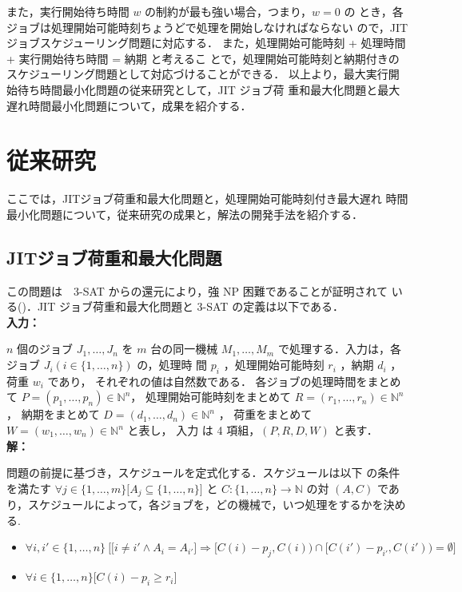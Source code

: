 \documentclass[12pt]{optlab-bachelor}
\begin{document}
また，実行開始待ち時間 $w$ の制約が最も強い場合，つまり，$w = 0$ の
とき，各ジョブは処理開始可能時刻ちょうどで処理を開始しなければならない
ので，JITジョブスケジューリング問題に対応する．
また，処理開始可能時刻 + 処理時間 + 実行開始待ち時間 = 納期 と考えるこ
とで，処理開始可能時刻と納期付きのスケジューリング問題として対応づけることができる．
以上より，最大実行開始待ち時間最小化問題の従来研究として，JIT ジョブ荷
重和最大化問題と最大遅れ時間最小化問題について，成果を紹介する．


\chapter{従来研究}
ここでは，JITジョブ荷重和最大化問題と，処理開始可能時刻付き最大遅れ
時間最小化問題について，従来研究の成果と，解法の開発手法を紹介する．

\section{JITジョブ荷重和最大化問題} %
この問題は　3-SAT からの還元により，強 NP 困難であることが証明されて
いる()．JIT ジョブ荷重和最大化問題と 3-SAT の定義は以下である．\\

\noindent \textbf{入力：}

$n$ 個のジョブ $J_1,\ldots,J_n$ を $m$ 台の同一機械 $M_1,\ldots,M_m$
で処理する．入力は，各ジョブ $J_i ( i \in \{1,\ldots,n\} )$ の，処理時
間 $p_i$ ，処理開始可能時刻 $r_i$ ，納期 $d_i$ ，荷重 $w_i$ であり，
それぞれの値は自然数である．
各ジョブの処理時間をまとめて $P = (p_1,\ldots,p_n) \in \mathbb{N}^n$，
処理開始可能時刻をまとめて $R = (r_1,\ldots,r_n) \in \mathbb{N}^n$ ，
納期をまとめて $D = (d_1,\ldots,d_n) \in \mathbb{N}^n$ ，
荷重をまとめて $W = (w_1,\ldots,w_n) \in \mathbb{N}^n$ と表し，
入力 は 4 項組，$(P,R,D,W)$ と表す．\\

\noindent \textbf{解：}

問題の前提に基づき，スケジュールを定式化する．スケジュールは以下
の条件を満たす $\forall j \in \{1,\ldots,m\}\big[A_j \subseteq
\{1,\ldots,n\}\big]$ と $C : \{1,\ldots,n\} \to \mathbb{N}$ の対 $(A,
C)$ であり，スケジュールによって，各ジョブを，どの機械で，いつ処理をするかを決める.
\begin{itemize}
\item $\forall i, i' \in \{1,\ldots,n\}\ \Big[ \big[i \neq i' \land A_i =
  A_{i'}\big] \Rightarrow [C(i) - p_j, C(i)) \cap [C(i') - p_{i'}, C(i')) = \emptyset \Big]$
\item  $\forall i \in \{1,\ldots,n\}\big[C(i) - p_i \ge r_i\big]$
\end{itemize}
\end{document}
